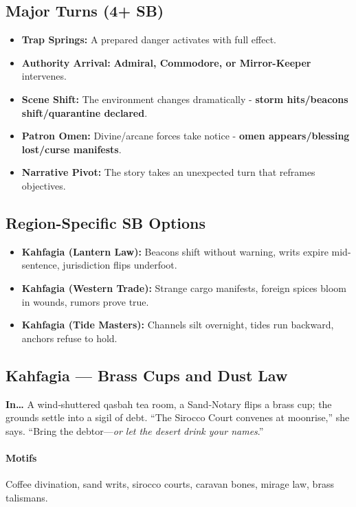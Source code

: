 \subsection*{Major Turns (4+ SB)}
\begin{itemize}
\item \textbf{Trap Springs:} A prepared danger activates with full effect.
\item \textbf{Authority Arrival:} \textbf{Admiral, Commodore, or Mirror-Keeper} intervenes.
\item \textbf{Scene Shift:} The environment changes dramatically - \textbf{storm hits/beacons shift/quarantine declared}.
\item \textbf{Patron Omen:} Divine/arcane forces take notice - \textbf{omen appears/blessing lost/curse manifests}.
\item \textbf{Narrative Pivot:} The story takes an unexpected turn that reframes objectives.
\end{itemize}

\subsection*{Region-Specific SB Options}
\begin{itemize}
\item \textbf{Kahfagia (Lantern Law):} Beacons shift without warning, writs expire mid-sentence, jurisdiction flips underfoot.
\item \textbf{Kahfagia (Western Trade):} Strange cargo manifests, foreign spices bloom in wounds, rumors prove true.
\item \textbf{Kahfagia (Tide Masters):} Channels silt overnight, tides run backward, anchors refuse to hold.
\end{itemize}


\subsection*{Kahfagia — Brass Cups and Dust Law}
\textbf{In…} A wind‑shuttered qasbah tea room, a Sand‑Notary flips a brass cup; the grounds settle into a sigil of debt. “The Sirocco Court convenes at moonrise,” she says. “Bring the debtor—\emph{or let the desert drink your names}.”

\paragraph{Motifs} Coffee divination, sand writs, sirocco courts, caravan bones, mirage law, brass talismans.
